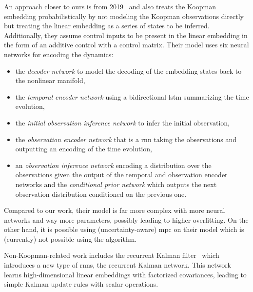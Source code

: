 An approach closer to ours is from 2019~\cite{mortonDeepVariationalKoopman2019a} and also treats the Koopman embedding probabilistically by not modeling the Koopman observations directly but treating the linear embedding as a series of states to be inferred. Additionally, they assume control inputs to be present in the linear embedding in the form of an additive control with a control matrix. Their model uses six neural networks for encoding the dynamics:
\begin{itemize}
	\setlength{\itemsep}{-4pt}
	\item the \emph{decoder network} to model the decoding of the embedding states back to the nonlinear manifold,
	\item the \emph{temporal encoder network} using a bidirectional \ac{lstm} summarizing the time evolution,
	\item the \emph{initial observation inference network} to infer the initial observation,
	\item the \emph{observation encoder network} that is a \ac{rnn} taking the observations and outputting an encoding of the time evolution,
	\item an \emph{observation inference network} encoding a distribution over the observations given the output of the temporal and observation encoder networks and
	the \emph{conditional prior network} which outputs the next observation distribution conditioned on the previous one.
\end{itemize}
Compared to our work, their model is far more complex with more neural networks and way more parameters, possibly leading to higher overfitting. On the other hand, it is possible using (uncertainty-aware) \ac{mpc} on their model which is (currently) not possible using the \algname algorithm.

Non-Koopman-related work includes the recurrent Kalman filter~\cite{beckerRecurrentKalmanNetworks2019a} which introduces a new type of \acp{rnn}, the recurrent Kalman network. This network learns high-dimensional linear embeddings with factorized covariances, leading to simple Kalman update rules with scalar operations.
